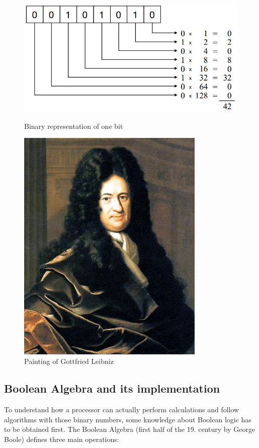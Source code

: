 \begin{figure}[H]
\centering
\begin{minipage}{0.5\textwidth}
  \includegraphics[width=1\textwidth]{binary.png}%
  \caption{Binary representation of one bit}%
  \label{fig:binary}
\end{minipage}%
\begin{minipage}{.4\textwidth}
  \centering
  \includegraphics[width=0.8\textwidth]{leibniz}%
  \caption{Painting of Gottfried Leibniz}%
  \label{fig:leibniz}
\end{minipage}
\end{figure}

\subsection{Boolean Algebra and its implementation}
To understand how a processor can actually perform calculations and follow algorithms with those binary numbers, some knowledge about Boolean logic has to be obtained first. The Boolean Algebra (first half of the 19. century by George Boole) defines three main operations: 

